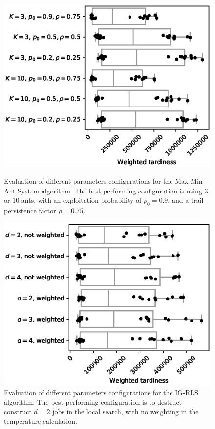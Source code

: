 \documentclass[runningheads]{llncs}
\begin{document}
\begin{figure}
    \centering
    \begin{minipage}{.48\textwidth}
		\centering
		\includegraphics[width=1.1\textwidth]{MaxMinAS-params.eps}
		\caption{Evaluation of different parameters configurations for the Max-Min
		Ant System algorithm. The best performing configuration is using 3 or 10
		ants, with an exploitation probability of $p_0=0.9$, and a trail persistence
		factor $\rho=0.75$.}
		\label{MaxMinAS-params}
    \end{minipage}
    \hspace{0.02\textwidth}
    \begin{minipage}{.48\textwidth}
		\centering
		\includegraphics[width=1.1\textwidth]{IG_RLS-params.eps}
		\caption{Evaluation of different parameters configurations for the IG-RLS
		algorithm. The best performing configuration is to destruct-construct $d=2$
		jobs in the local search, with no weighting in the temperature calculation.}
		\label{IG_RLS-params}
    \end{minipage}
\end{figure}
\end{document}
